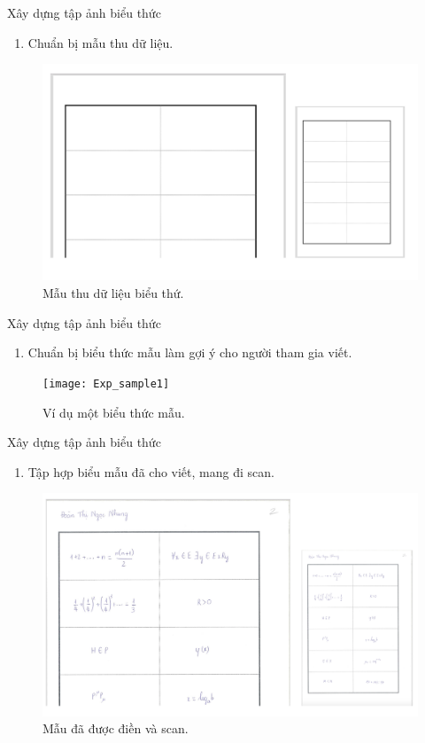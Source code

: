\documentclass{beamer}
\newcounter{saveenumi}
\newcommand{\seti}{\setcounter{saveenumi}{\value{enumi}}}
\newcommand{\conti}{\setcounter{enumi}{\value{saveenumi}}}
\begin{document}
	\begin{frame}[<+->]{Xây dựng tập ảnh biểu thức}
		\begin{enumerate}
		\item Chuẩn bị mẫu thu dữ liệu.
		\seti
		\end{enumerate}
		\begin{figure}[!h]
			\centering
			\includegraphics[width=0.9\linewidth]{getExp}
			\vspace{0.2cm}
			\caption{Mẫu thu dữ liệu biểu thứ.}
		\end{figure}
	\end{frame}
	
	\begin{frame}[<+->]{Xây dựng tập ảnh biểu thức}
	\begin{enumerate}
		\conti
		\item Chuẩn bị biểu thức mẫu làm gợi ý cho người tham gia viết.
		\seti
	\end{enumerate}
	\begin{figure}[!h]
		\centering
		\texttt{[image: Exp\_sample1]}
		\vspace{0.5cm}
		\caption{Ví dụ một biểu thức mẫu.}
	\end{figure}
	\end{frame}

	\begin{frame}{Xây dựng tập ảnh biểu thức}
	\begin{enumerate}
		\conti
		\item Tập hợp biểu mẫu đã cho viết, mang đi scan.
		\seti
	\end{enumerate}
	\begin{figure}[!h]
		\centering
		\includegraphics[width=0.85\linewidth]{Exp_sample}
		\vspace{0.2cm}
		\caption{Mẫu đã được điền và scan.}
	\end{figure}
	\end{frame}
	
\end{document}
